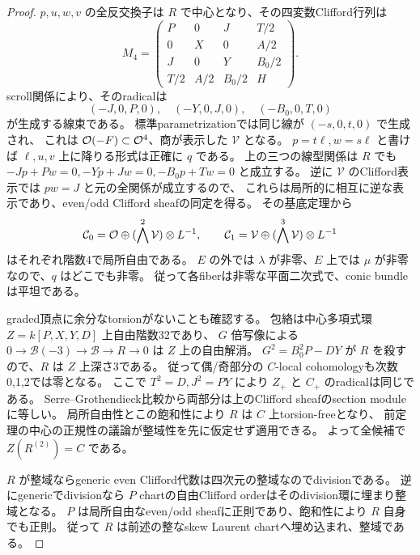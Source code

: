 \begin{proof}
$p,u,w,v$ の全反交換子は $R$ で中心となり、その四変数Clifford行列は
\[
 M_4=\begin{pmatrix}
 P&0&J&T/2\\0&X&0&A/2\\J&0&Y&B_0/2\\T/2&A/2&B_0/2&H
 \end{pmatrix}.
\]
scroll関係により、そのradicalは
\[
 (-J,0,P,0),\quad(-Y,0,J,0),\quad(-B_0,0,T,0)
\]
が生成する線束である。
標準parametrizationでは同じ線が $(-s,0,t,0)$ で生成され、
これは $\mathcal O(-F)\subset\mathcal O^4$、商が表示した $\mathcal V$ となる。
$p=t\ell,w=s\ell$ と書けば $\ell,u,v$ 上に降りる形式は正確に $q$ である。
上の三つの線型関係は $R$ でも
$-Jp+Pw=0,-Yp+Jw=0,-B_0p+Tw=0$ と成立する。
逆に $\mathcal V$ のClifford表示では $pw=J$ と元の全関係が成立するので、
これらは局所的に相互に逆な表示であり、even/odd Clifford sheafの同定を得る。
その基底定理から
\[
 \mathcal C_0=\mathcal O\oplus(\bigwedge^2\mathcal V)\otimes L^{-1},\qquad
 \mathcal C_1=\mathcal V\oplus(\bigwedge^3\mathcal V)\otimes L^{-1}
\]
はそれぞれ階数4で局所自由である。
$E$ の外では $\lambda$ が非零、$E$ 上では $\mu$ が非零なので、$q$ はどこでも非零。
従って各fiberは非零な平面二次式で、conic bundleは平坦である。

graded頂点に余分なtorsionがないことも確認する。
包絡は中心多項式環 $Z=k[P,X,Y,D]$ 上自由階数32であり、
$G$ 倍写像による $0\to\mathcal B(-3)\to\mathcal B\to R\to0$ は $Z$ 上の自由解消。
$G^2=B_0^2P-DY$ が $R$ を殺すので、$R$ は $Z$ 上深さ3である。
従って偶/奇部分の $C$-local cohomologyも次数0,1,2では零となる。
ここで $T^2=D,J^2=PY$ により $Z_+$ と $C_+$ のradicalは同じである。
Serre--Grothendieck比較から両部分は上のClifford sheafのsection moduleに等しい。
局所自由性とこの飽和性により $R$ は $C$ 上torsion-freeとなり、
前定理の中心の正規性の議論が整域性を先に仮定せず適用できる。
よって全候補で $Z(R^{(2)})=C$ である。

$R$ が整域ならgeneric even Clifford代数は四次元の整域なのでdivisionである。
逆にgenericでdivisionなら $P$ chartの自由Clifford orderはそのdivision環に埋まり整域となる。
$P$ は局所自由なeven/odd sheafに正則であり、飽和性により $R$ 自身でも正則。
従って $R$ は前述の整なskew Laurent chartへ埋め込まれ、整域である。
\end{proof}

